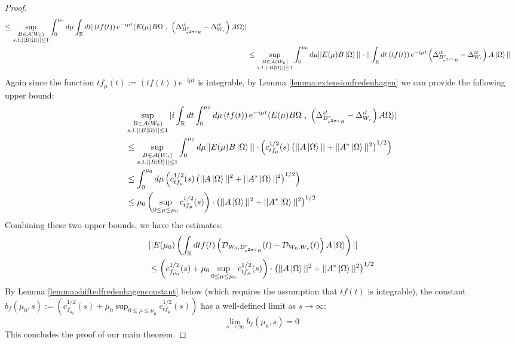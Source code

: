 \documentclass[a4paper,11pt]{article}
\theoremstyle{definition}
\newcommand{\lb}{\left(}
\newcommand{\rb}{\right)}
\begin{document}
\begin{proof}
\begin{align}
\begin{split}
            \leq \sup_{\substack{B\in\mathcal{A}(W_0)\\s.t.||B\ket{\Omega}||\leq 1}}\int_0^{\mu_0}d\mu\int_\mathbb{R} dt |\lb tf(t)\rb e^{-i\mu t}\langle E(\mu)B\Omega\text{ , }\lb \Delta^{it}_{B^r_{e^{2\pi s}R}} - \Delta^{it}_{W_r} \rb A\Omega \rangle|
            \\&
            \leq \sup_{\substack{B\in\mathcal{A}(W_0)\\s.t.||B\ket{\Omega}||\leq 1}}\int_0^{\mu_0}d\mu ||E(\mu) B\ket{\Omega}||\cdot||\int_\mathbb{R} dt\lb tf(t) \rb e^{-i\mu t}\lb\Delta^{it}_{B^r_{e^{2\pi s}R}}- \Delta^{it}_{W_r}\rb A\ket{\Omega}||
        \end{split}
    \end{align}
    Again since the function $tf_\mu(t):= \lb tf(t) \rb e^{-i\mu t}$ is integrable, by Lemma \ref{lemma:extensionfredenhagen} we can provide the following upper bound:
    \begin{align}
        \begin{split}
            &\sup_{\substack{B\in\mathcal{A}(W_0)\\s.t.||B\ket{\Omega}||\leq 1}}|i\int_\mathbb{R} dt \int_0^{\mu_0}d\mu \lb tf(t)\rb e^{-i\mu t}\langle E(\mu)B\Omega\text{ , }\lb\Delta^{it}_{B^r_{e^{2\pi s}R}} - \Delta^{it}_{W_r}\rb A\Omega \rangle|
            \\&
            \leq \sup_{\substack{B\in\mathcal{A}(W_0)\\s.t.||B\ket{\Omega}||\leq 1}}\int_0^{\mu_0}d\mu ||E(\mu)B\ket{\Omega}||\cdot\lb c^{1/2}_{t f_\mu}(s)\lb||A\ket{\Omega}|| + ||A^*\ket{\Omega}||^2\rb^{1/2}\rb
            \\&
            \leq \int_0^{\mu_0}d\mu \lb c^{1/2}_{tf_\mu}(s)\lb||A\ket{\Omega}||^2 + ||A^*\ket{\Omega}||^2\rb^{1/2}\rb 
            \\&
            \leq \mu_0\lb\sup_{0\leq \mu\leq \mu_0}c^{1/2}_{tf_\mu}(s)\rb\cdot\lb||A\ket{\Omega}||^2 + ||A^*\ket{\Omega}||^2\rb^{1/2}
        \end{split}
    \end{align}
    Combining these two upper bounds, we have the estimates:
    \begin{align}
        \begin{split}
            &||E(\mu_0)\lb\int_\mathbb{R} dt f(t)\lb\mathcal{D}_{W_0, B^r_{e^{2\pi s}R}}(t) - \mathcal{D}_{W_0, W_r}(t)\rb A\ket{\Omega}\rb||
            \\&
            \leq \lb c^{1/2}_{f_{\mu_0}}(s) + \mu_0\sup_{0\leq \mu\leq \mu_0}c^{1/2}_{tf_\mu}(s) \rb\cdot\lb||A\ket{\Omega}||^2 + ||A^*\ket{\Omega}||^2\rb^{1/2}
        \end{split}
    \end{align}
    By Lemma \ref{lemma:shiftedfredenhagenconstant} below (which requires the assumption that $tf(t)$ is integrable), the constant $b_f(\mu_0, s) := \lb c^{1/2}_{f_{\mu_0}}(s) + \mu_0\sup_{0\leq \mu\leq \mu_0}c^{1/2}_{tf_\mu}(s)\rb$ has a well-defined limit as $s\rightarrow\infty$:
    \begin{equation}
        \lim_{s\rightarrow\infty}b_f(\mu_0, s) = 0
    \end{equation}
    This concludes the proof of our main theorem. 
\end{proof}
\end{document}
